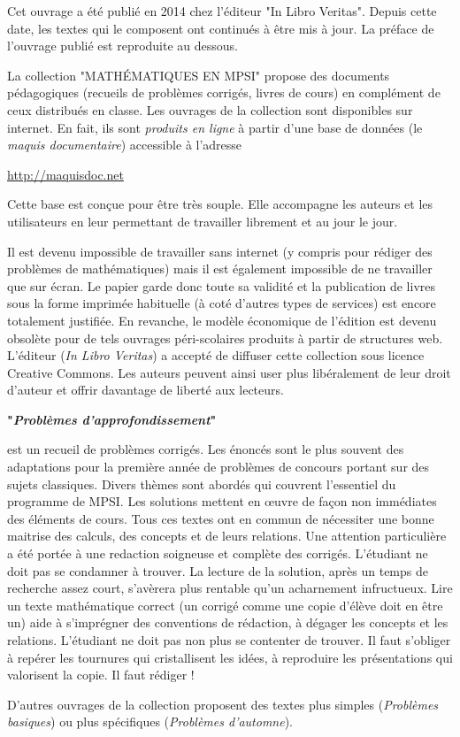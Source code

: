 Cet ouvrage a été publié en 2014 chez l'éditeur "In Libro Veritas". Depuis cette date, les textes qui le composent ont continués à être mis à jour. La préface de l'ouvrage publié est reproduite au dessous.


La collection "MATH\'EMATIQUES EN MPSI" propose des documents pédagogiques (recueils de problèmes corrigés, livres de cours) en complément de ceux distribués en classe.\newline
Les ouvrages de la collection sont  disponibles sur internet. En fait, ils sont \emph{produits en ligne} à partir d'une base de données (le \emph{maquis documentaire}) accessible à l'adresse
\begin{center}
 \href{http://maquisdoc.net}{http://maquisdoc.net}
\end{center}
Cette base est conçue pour être très souple. Elle accompagne les auteurs et les utilisateurs en leur permettant de travailler librement et au jour le jour.

Il est devenu impossible de travailler sans internet (y compris pour rédiger des problèmes de mathématiques) mais il est également impossible de ne travailler que sur écran. Le papier garde donc toute sa validité et la publication de livres sous la forme imprimée habituelle (à coté d'autres types de services) est encore totalement justifiée.\newline
En revanche, le modèle économique de l'édition est devenu obsolète pour de tels ouvrages péri-scolaires produits à partir de structures web. L'éditeur (\emph{In Libro Veritas}) a accepté de diffuser cette collection sous licence Creative Commons. Les auteurs peuvent ainsi user plus libéralement de leur droit d'auteur et offrir davantage de liberté aux lecteurs.

\begin{center}
 \textbf{"\emph{Problèmes d'approfondissement}"}
\end{center}
est un recueil de problèmes corrigés.\newline
Les énoncés sont le plus souvent des adaptations pour la première année de problèmes de concours portant sur des sujets classiques. Divers thèmes sont abordés qui couvrent l'essentiel du programme de MPSI.  Les solutions mettent en \oe{}uvre de façon non immédiates des éléments de cours. Tous ces textes ont en commun de nécessiter une bonne maitrise des calculs, des concepts et de leurs relations.\newline
Une attention particulière a été portée à une redaction soigneuse et complète des corrigés. L'étudiant ne doit pas se condamner à trouver. La lecture de la solution, après un temps de recherche assez court, s'avèrera plus rentable qu'un acharnement infructueux. Lire un texte mathématique correct (un corrigé comme une copie d'élève doit en être un) aide à s'imprégner des conventions de rédaction, à dégager les concepts et les relations. L'étudiant ne doit pas non plus se contenter de trouver. Il faut s'obliger à repérer les tournures qui cristallisent les idées, à reproduire les présentations qui valorisent la copie. Il faut rédiger !


D'autres ouvrages de la collection proposent des textes plus simples (\emph{Problèmes basiques}) ou plus spécifiques (\emph{Problèmes d'automne}).
 
